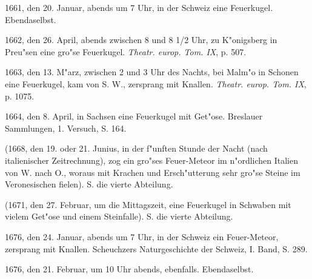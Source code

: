 \documentclass[a4paper, 11pt, oneside, polutonikogreek, german]{article}
\begin{document}
1661, den 20. Januar, abends um 7 Uhr, in der Schweiz eine Feuerkugel. Ebendaselbst.

1662, den 26. April, abends zwischen 8 und 8 1/2 Uhr, zu K"onigsberg in Preu"sen eine gro"se Feuerkugel. \emph{Theatr. europ. Tom. IX}, p. 507.

1663, den 13. M"arz, zwischen 2 und 3 Uhr des Nachts, bei Malm"o in Schonen eine Feuerkugel, kam von S. W., zersprang mit Knallen. \emph{Theatr. europ. Tom. IX}, p. 1075.

1664, den 8. April, in Sachsen eine Feuerkugel mit Get"ose. Breslauer Sammlungen, 1. Versuch, S. 164.

(1668, den 19. oder 21. Junius, in der f"unften Stunde der Nacht (nach italienischer Zeitrechnung), zog ein gro"ses Feuer-Meteor im n"ordlichen Italien von W. nach O., woraus mit Krachen und Ersch"utterung sehr gro"se Steine im Veronesischen fielen). S. die vierte Abteilung.

(1671, den 27. Februar, um die Mittagszeit, eine Feuerkugel in Schwaben mit vielem Get"ose und einem Steinfalle). S. die vierte Abteilung.

1676, den 24. Januar, abends um 7 Uhr, in der Schweiz ein Feuer-Meteor, zersprang mit Knallen. Scheuchzers Naturgeschichte der Schweiz, I. Band, S. 289.

1676, den 21. Februar, um 10 Uhr abends, ebenfalls. Ebendaselbst.
\end{document}
